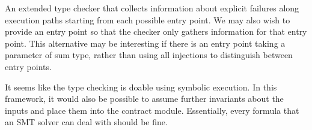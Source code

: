 \documentclass[a4paper]{llncs}
\begin{document}
An extended type checker that collects information about explicit failures along execution paths
starting from each possible entry point. We may also wish to provide an entry point so that the
checker only gathers information for that entry point. This alternative may be interesting if there
is an entry point taking a parameter of sum type, rather than using all injections to distinguish
between entry points.

It seems like the type checking is doable using symbolic execution. In this framework, it would also
be possible to assume further invariants about the inputs and place them into the contract
module. Essentially, every formula that an SMT solver can deal with should be fine.
\end{document}
